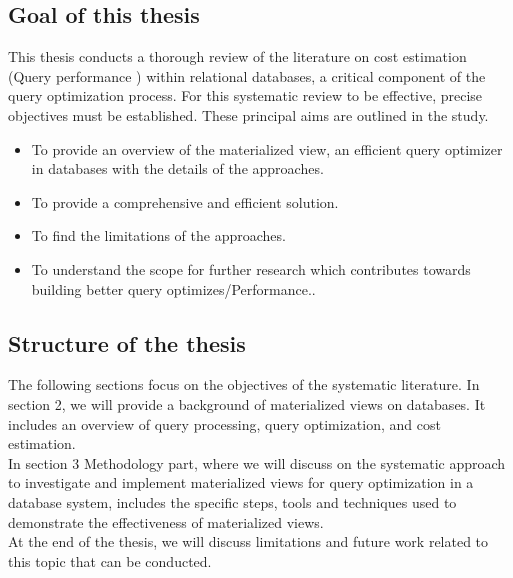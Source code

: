\subsection{Goal of this thesis}
\normalsize
This thesis conducts a thorough review of the literature on cost estimation (Query performance ) within relational databases, a critical component of the query optimization process. For this systematic review to be effective, precise objectives must be established. These principal aims are outlined in the study.\cite{CostEstimation}
\begin{itemize}
  \item To provide an overview of the materialized view, an efficient query optimizer in databases with the details of the approaches.
  \item To provide a comprehensive and efficient solution.
  \item To find the limitations of the approaches.
  \item To understand the scope for further research which contributes towards building
better query optimizes/Performance..\cite{CostEstimation}
\end{itemize}
\subsection{Structure of the thesis }
The following sections focus on the objectives of the systematic literature. In section 2, we will provide a background of materialized views on databases. It includes an overview of query processing, query optimization, and cost estimation.\\
In section 3 Methodology part, where we will discuss on the systematic approach to investigate and implement materialized views for query optimization in a database system, includes the specific steps, tools and techniques used to demonstrate the effectiveness of materialized views.\\
At the end of the thesis, we will discuss limitations and future work related to this topic that can be conducted.









